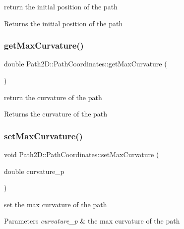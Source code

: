 return the initial position of the path 

\begin{DoxyReturn}{Returns}
the initial position of the path 
\end{DoxyReturn}
\mbox{\label{class_path2_d_1_1_path_coordinates_ada194582d1892714ed91e12824dc3a8b}} 
\subsubsection{\texorpdfstring{get\+Max\+Curvature()}{getMaxCurvature()}}
{\footnotesize\ttfamily double Path2\+D\+::\+Path\+Coordinates\+::get\+Max\+Curvature (\begin{DoxyParamCaption}{ }\end{DoxyParamCaption})}



return the curvature of the path 

\begin{DoxyReturn}{Returns}
the curvature of the path 
\end{DoxyReturn}
\mbox{\label{class_path2_d_1_1_path_coordinates_adccb86c0322e9f2dcf7845b3af42cc84}} 
\subsubsection{\texorpdfstring{set\+Max\+Curvature()}{setMaxCurvature()}}
{\footnotesize\ttfamily void Path2\+D\+::\+Path\+Coordinates\+::set\+Max\+Curvature (\begin{DoxyParamCaption}\item[{double}]{curvature\+\_\+p }\end{DoxyParamCaption})}



set the max curvature of the path 


\begin{DoxyParams}{Parameters}
{\em curvature\+\_\+p} & the max curvature of the path \\
\hline
\end{DoxyParams}
\mbox{\label{class_path2_d_1_1_path_coordinates_a0a38aea42684b3297b9820473f51ec75}} 
